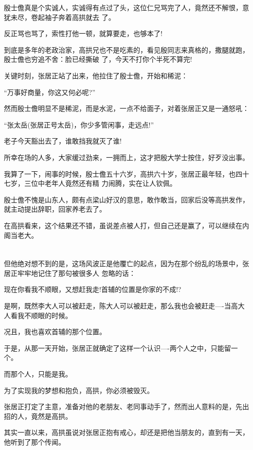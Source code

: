\documentclass[11pt,a4paper,onecolumn]{article}
\begin{document}
殷士儋真是个实诚人，实诚得有点过了头，这位仁兄骂完了人，竟然还不解恨，意犹未尽，卷起袖子奔着高拱就去
了。

反正骂也骂了，索性打他一顿，就算要走，也够本了!

到底是多年的老政治家，高拱兄也不是吃素的，看见殷同志来真格的，撒腿就跑，殷士儋也穷追不舍：脸已经撕破
了，今天不打你个半死不算完!

关键时刻，张居正站了出来，他拉住了殷士儋，开始和稀泥：

``万事好商量，你这又何必呢?''

然而殷士儋明显不是稀泥，而是水泥，一点不给面子，对着张居正又是一通怒吼：

``张太岳(张居正号太岳)，你少多管闲事，走远点!''

老子今天豁出去了，谁敢挡我就灭了谁!

所幸在场的人多，大家缓过劲来，一拥而上，这才把殷大学士按住，好歹没出事。

我算了一下，闹事的时候，殷士儋五十六岁，高拱六十岁，张居正最年轻，也四十七岁，三位中老年人竟然还有精
力闹腾，实在让人钦佩。

殷士儋不愧是山东人，颇有点梁山好汉的意思，敢作敢当，回家后没等高拱发作，就主动提出辞职，回家养老去了。

在高拱看来，这个结果还不错，虽说差点被人打，但自己还是赢了，可以继续在内阁当老大。

\section[\thesection]{}

但他绝对想不到的是，这场风波正是他覆亡的起点，因为在那个纷乱的场景中，张居正牢牢地记住了那句被很多人
忽略的话：

现在你看我不顺眼，又想赶我走!首辅的位置是你家的不成!?

是啊，既然李大人可以被赶走，陈大人可以被赶走，那么我也会被赶走----当高大人看我不顺眼的时候。

况且，我也喜欢首辅的那个位置。

于是，从那一天开始，张居正就确定了这样一个认识----两个人之中，只能留一个。

而那个人，只能是我。

为了实现我的梦想和抱负，高拱，你必须被毁灭。

张居正打定了主意，准备对他的老朋友、老同事动手了，然而出人意料的是，先出招的人，竟然是高拱。

其实一直以来，高拱虽说对张居正抱有戒心，却还是把他当朋友的，直到有一天，他听到了那个传闻。
\end{document}
